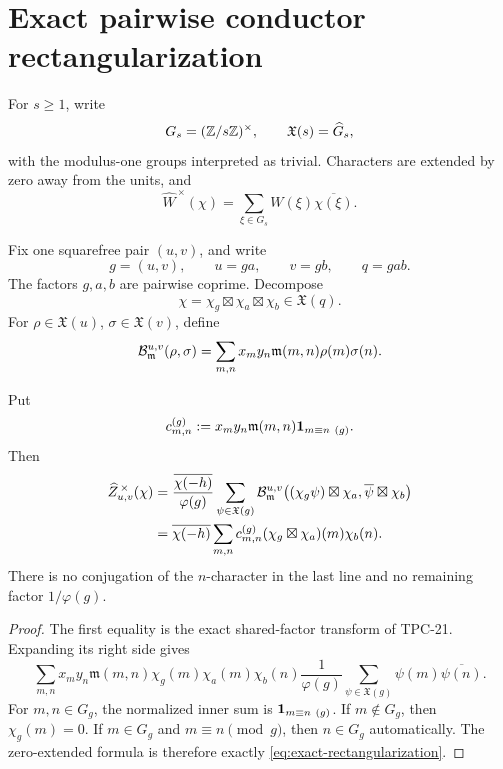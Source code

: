 \section{Exact pairwise conductor rectangularization}
\label{sec:rectangularization}

For \(s\ge1\), write
\[
 G_s=(\mathbb Z/s\mathbb Z)^\times,\qquad \mathfrak X(s)=\widehat G_s,
\]
with the modulus-one groups interpreted as trivial.  Characters are
extended by zero away from the units, and
\begin{equation}
 \widehat W^{\,\times}(\chi)
 =\sum_{\xi\in G_s}W(\xi)\overline{\chi(\xi)}.
 \label{eq:multiplicative-transform}
\end{equation}

Fix one squarefree pair \((u,v)\), and write
\begin{equation}
 g=(u,v),\qquad u=ga,\qquad v=gb,\qquad q=gab.
 \label{eq:gab}
\end{equation}
The factors \(g,a,b\) are pairwise coprime.  Decompose
\[
 \chi=\chi_g\boxtimes\chi_a\boxtimes\chi_b\in\mathfrak X(q).
\]
For \(\rho\in\mathfrak X(u)\), \(\sigma\in\mathfrak X(v)\), define
\begin{equation}
 \mathcal B_{\mathfrak m}^{u,v}(\rho,\sigma)
 =\sum_{m,n}x_my_n\mathfrak m(m,n)\rho(m)\sigma(n).
 \label{eq:masked-B}
\end{equation}

\begin{theorem}
\label{thm:pairwise-rectangularization}
Put
\begin{equation}
 c_{m,n}^{(g)}
 :=x_my_n\mathfrak m(m,n)\mathbf 1_{m\equiv n\ (g)}.
 \label{eq:cg-matrix}
\end{equation}
Then
\begin{align}
 \widehat Z_{u,v}^{\,\times}(\chi)
 &=\frac{\overline{\chi(-h)}}{\varphi(g)}
 \sum_{\psi\in\mathfrak X(g)}
 \mathcal B_{\mathfrak m}^{u,v}
 \bigl((\chi_g\psi)\boxtimes\chi_a,
       \overline\psi\boxtimes\chi_b\bigr)
 \notag\\
 &=\overline{\chi(-h)}
 \sum_{m,n}c_{m,n}^{(g)}
 (\chi_g\boxtimes\chi_a)(m)\chi_b(n).
 \label{eq:exact-rectangularization}
\end{align}
There is no conjugation of the \(n\)-character in the last line and no
remaining factor \(1/\varphi(g)\).
\end{theorem}

\begin{proof}
The first equality is the exact shared-factor transform of TPC-21.
Expanding its right side gives
\[
 \sum_{m,n}x_my_n\mathfrak m(m,n)
 \chi_g(m)\chi_a(m)\chi_b(n)
 \frac1{\varphi(g)}\sum_{\psi\in\mathfrak X(g)}
 \psi(m)\overline{\psi(n)}.
\]
For \(m,n\in G_g\), the normalized inner sum is
\(\one_{m\equiv n\ (g)}\).  If \(m\notin G_g\), then
\(\chi_g(m)=0\).  If \(m\in G_g\) and \(m\equiv n\pmod g\), then
\(n\in G_g\) automatically.  The zero-extended formula is therefore
exactly \eqref{eq:exact-rectangularization}.
\end{proof}

